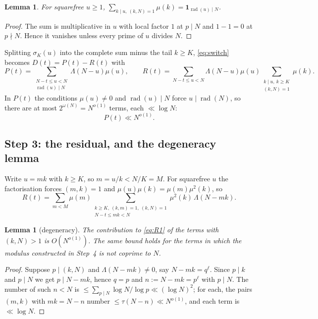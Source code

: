 \documentclass[11pt,a4paper]{article}
\theoremstyle{plain}
\newtheorem{lemma}[theorem]{Lemma}
\theoremstyle{definition}
\DeclareMathOperator{\rad}{rad}
\begin{document}
\begin{lemma}\label{lem:complete}
For squarefree $u\ge1$,
$\displaystyle\sum_{k\mid u,\ (k,N)=1}\mu(k)=\mathbf 1_{\rad(u)\mid N}$.
\end{lemma}

\begin{proof}
The sum is multiplicative in $u$ with local factor $1$ at $p\mid N$ and
$1-1=0$ at $p\nmid N$. Hence it vanishes unless every prime of $u$
divides $N$.
\end{proof}

Splitting $\sigma_K(u)$ into the complete sum minus the tail $k\ge K$,
\eqref{eq:switch} becomes $D(t)=P(t)-R(t)$ with
\begin{equation}\label{eq:PR}
  P(t)=\!\!\sum_{\substack{N-t\le u<N\\ \rad(u)\mid N}}\!\!\Lambda(N-u)\mu(u),
  \qquad
  R(t)=\!\!\sum_{N-t\le u<N}\!\!\Lambda(N-u)\mu(u)
       \sum_{\substack{k\mid u,\ k\ge K\\ (k,N)=1}}\mu(k).
\end{equation}
In $P(t)$ the conditions $\mu(u)\ne0$ and $\rad(u)\mid N$ force
$u\mid\rad(N)$, so there are at most $2^{\omega(N)}=N^{o(1)}$ terms, each
$\ll\log N$:
\begin{equation}\label{eq:P}
  P(t)\ll N^{o(1)} .
\end{equation}

\subsection{Step 3: the residual, and the degeneracy lemma}

Write $u=mk$ with $k\ge K$, so $m=u/k<N/K=M$. For squarefree $u$ the
factorisation forces $(m,k)=1$ and $\mu(u)\mu(k)=\mu(m)\mu^2(k)$, so
\begin{equation}\label{eq:R1}
  R(t)=\sum_{m<M}\mu(m)
      \sum_{\substack{k\ge K,\ (k,m)=1,\ (k,N)=1\\ N-t\le mk<N}}
      \mu^2(k)\,\Lambda(N-mk).
\end{equation}

\begin{lemma}[degeneracy]\label{lem:degen}
The contribution to \eqref{eq:R1} of the terms with $(k,N)>1$ is
$O(N^{o(1)})$. The same bound holds for the terms in which the modulus
constructed in Step~4 is not coprime to $N$.
\end{lemma}

\begin{proof}
Suppose $p\mid(k,N)$ and $\Lambda(N-mk)\ne0$, say $N-mk=q^\ell$. Since
$p\mid k$ and $p\mid N$ we get $p\mid N-mk$, hence $q=p$ and
$n:=N-mk=p^\ell$ with $p\mid N$. The number of such $n<N$ is
$\le\sum_{p\mid N}\log N/\log p\ll(\log N)^2$; for each, the pairs
$(m,k)$ with $mk=N-n$ number $\le\tau(N-n)\ll N^{o(1)}$, and each term is
$\ll\log N$.
\end{proof}
\end{document}
